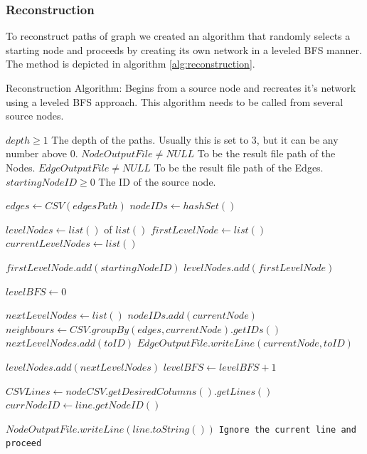 \documentclass[sigconf, nonacm]{acmart}
\begin{document}
\subsubsection{Reconstruction} 
To reconstruct paths of graph we created an algorithm that randomly selects a starting node and proceeds by creating its own network in a leveled BFS manner. The method is depicted in algorithm \ref{alg:reconstruction}. 
\begin{algorithm}
\caption{Reconstruction Algorithm: Begins from a source node and recreates it's network using a leveled BFS approach. This algorithm needs to be called from several source nodes.}\label{alg:reconstruction}
\begin{algorithmic}
\Require $depth \geq 1$ The depth of the paths. Usually this is set to 3, but it can be any number above 0.
\Require $NodeOutputFile \neq NULL$ To be the result file path of the Nodes.
\Require $EdgeOutputFile \neq NULL$ To be the result file path of the Edges.
\Require $startingNodeID \geq 0$ The ID of the source node.

\State

\State $edges \gets CSV(edgesPath)$
\State $nodeIDs \gets hashSet()$

\State $levelNodes \gets list()$ of $list()$
\State $firstLevelNode \gets list()$
\State $currentLevelNodes \gets list()$

\State $firstLevelNode.add(startingNodeID)$
\State $levelNodes.add(firstLevelNode)$

\State $levelBFS \gets 0$

\State
{}
    \State $nextLevelNodes \gets list()$
        \State $nodeIDs.add(currentNode)$
        \State $neighbours \gets CSV.groupBy(edges, currentNode).getIDs()$
                \State $nextLevelNodes.add(toID)$
            \EndIf
            \State $EdgeOutputFile.writeLine(currentNode, toID)$
        \EndFor
    \EndFor
    
    \State $levelNodes.add(nextLevelNodes)$
    \State $levelBFS \gets levelBFS+1$
\EndWhile

\State
{}

    \State $CSVLines \gets nodeCSV.getDesiredColumns().getLines()$
        \State $currNodeID \gets line.getNodeID()$
        
            \State $NodeOutputFile.writeLine(line.toString())$
        \Else
           \State \texttt{Ignore the current line and proceed}
        \EndIf
        
    \EndFor
\EndFor

\end{algorithmic}
\end{algorithm}
\end{document}
